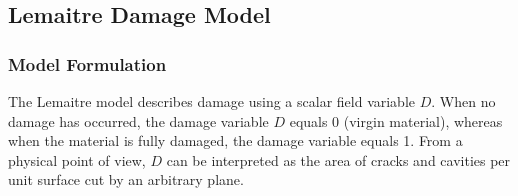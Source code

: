 \documentclass[sn-mathphys,Numbered]{sn-jnl}%
\newcommand{\bb}{\boldsymbol}
\begin{document}
%

\subsection{Lemaitre Damage Model}

\subsubsection{Model Formulation}

The Lemaitre model describes damage using a scalar field variable $D$.
When no damage has occurred, the damage variable $D$ equals 0 (virgin material), whereas when the material is fully damaged, the damage variable equals 1.
From a physical point of view, $D$ can be interpreted as the area of cracks and cavities per unit surface cut by an arbitrary plane.

%
\end{document}
